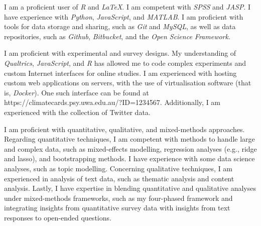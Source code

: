 

\begin{small} \color{black}


I am a proficient user of \textit{R} and \textit{\LaTeX}. I am competent with \textit{SPSS} and \textit{JASP}. I have experience with \textit{Python}, \textit{JavaScript}, and \textit{MATLAB}. I am proficient with tools for data storage and sharing, such as \textit{Git} and \textit{MySQL}, as well as data repositories, such as \textit{Github}, \textit{Bitbucket}, and the \textit{Open Science Framework}.

I am proficient with experimental and survey designs. My understanding of \textit{Qualtrics}, \textit{JavaScript}, and \textit{R} has allowed me to code complex experiments and custom Internet interfaces for online studies. I am experienced with hosting custom web applications on servers, with the use of virtualisation software (that is, \textit{Docker}). One such interface can be found at https://climatecards.psy.uwa.edu.au/?ID=1234567. Additionally, I am experienced with the collection of Twitter data.

I am proficient with quantitative, qualitative, and mixed-methods approaches. Regarding quantitative techniques, I am competent with methods to handle large and complex data, such as mixed-effects modelling, regression analyses (e.g., ridge and lasso), and bootstrapping methods. I have experience with some data science analyses, such as topic modelling. Concerning qualitative techniques, I am experienced in analysis of text data, such as thematic analysis and content analysis. Lastly, I have expertise in blending quantitative and qualitative analyses under mixed-methods frameworks, such as my four-phased framework \parencite{andreotta2019} and integrating insights from quantitative survey data with insights from text responses to open-ended questions.


\printbibliography[heading=none]

\end{small}

